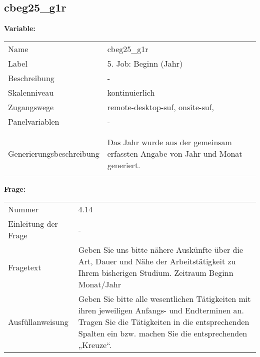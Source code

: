 	
	
	\subsection{cbeg25\_g1r}
	\label{subSection:cbeg25_g1r}

	\noindent\textbf{Variable:}\\
		\begin{tabular}{lL{11.3cm}}
			\label{tableVariable:cbeg25_g1r}
			Name & cbeg25\_g1r \\
			Label & 5. Job: Beginn (Jahr) \\
			Beschreibung & - \\
			Skalenniveau & kontinuierlich \\
			Zugangswege &
				remote-desktop-suf,
				onsite-suf,
 \\
			Panelvariablen & -
			 \\
			 \\
 \\
					Generierungsbeschreibung & Das Jahr wurde aus der gemeinsam erfassten Angabe von Jahr und Monat generiert. 
				 \\	
			 \\
		\end{tabular}

		\vspace*{1 cm}
		\noindent\textbf{Frage:}\\
		\begin{tabular}{lL{11.3cm}}
			\label{tableQuestion:cbeg25_g1r}
			Nummer & 4.14 \\
			Einleitung der Frage & - \\
			Fragetext & Geben Sie uns bitte nähere Auskünfte über die Art, Dauer und Nähe der Arbeitstätigkeit zu Ihrem bisherigen Studium.
Zeitraum
Beginn Monat/Jahr \\
			Ausfüllanweisung & Geben Sie bitte alle wesentlichen Tätigkeiten mit ihren jeweiligen Anfangs- und Endterminen an. Tragen Sie die Tätigkeiten in die entsprechenden Spalten ein bzw. machen Sie die entsprechenden „Kreuze“. \\
		\end{tabular}





